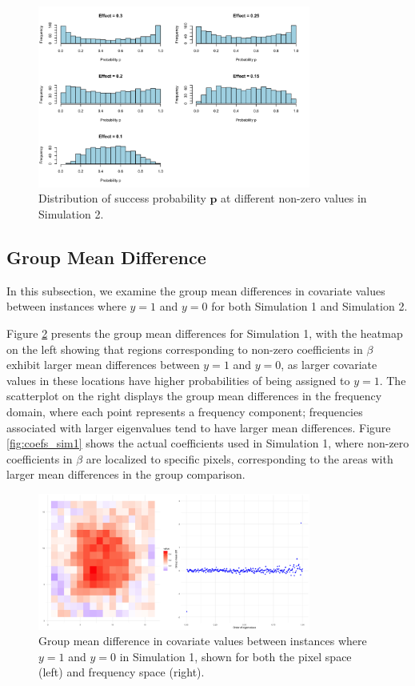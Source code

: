 \documentclass[12pt]{article}
\begin{document}
\begin{figure}[h!]
	\centering
	\includegraphics[width=0.8\textwidth]{sim2_p_dist.png}
  \caption{Distribution of success probability \( \mathbf{p} \) at different non-zero values in Simulation 2.}
	\label{fig:sim2_p_dist}
\end{figure}

\FloatBarrier

\subsection*{Group Mean Difference}

In this subsection, we examine the group mean differences in covariate values between instances where \( y = 1 \) and \( y = 0 \) for both Simulation 1 and Simulation 2.

Figure \ref{fig:group_diff1} presents the group mean differences for Simulation 1, with the heatmap on the left showing that regions corresponding to non-zero coefficients in \( \beta \) exhibit larger mean differences between \( y = 1 \) and \( y = 0 \), as larger covariate values in these locations have higher probabilities of being assigned to \( y = 1 \). The scatterplot on the right displays the group mean differences in the frequency domain, where each point represents a frequency component; frequencies associated with larger eigenvalues tend to have larger mean differences. Figure \ref{fig:coefs_sim1} shows the actual coefficients used in Simulation 1, where non-zero coefficients in \( \beta \) are localized to specific pixels, corresponding to the areas with larger mean differences in the group comparison.

\begin{figure}[h!]
	\centering
  \includegraphics[width=0.8\textwidth, height=0.35\textwidth]{group_mean_diff_sim1.png}
	\caption{Group mean difference in covariate values between instances where \( y = 1 \) and \( y = 0 \) in Simulation
		1, shown for both the pixel space (left) and frequency space (right).}
	\label{fig:group_diff1}
\end{figure}
\end{document}
